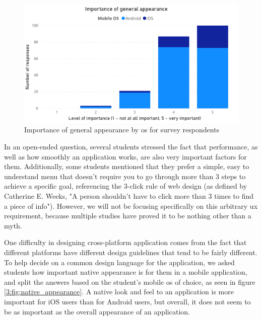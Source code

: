 \begin{figure}[ht]
    \centering
         \includegraphics[width=\textwidth]{figures/charts/survey/appearance.pdf}
    \caption{Importance of general appearance by \acrshort{os} for survey respondents}
    \label{3:fig:appearance}
\end{figure}

In an open-ended question, several students stressed the fact that performance, as well as how smoothly an application works, are also very important factors for them. Additionally, some students mentioned that they prefer a simple, easy to understand menu that doesn't require you to go through more than 3 steps to achieve a specific goal, referencing the 3-click rule of web design (as defined by Catherine E. Weeks\cite{weeks1997design}, "A person shouldn’t have to click more than 3 times to find a piece of info"). However, we will not be focusing specifically on this arbitrary \acrshort{ux} requirement, because multiple studies\cite{porter2003testing}\cite{nielsen2006prioritizing} have proved it to be nothing other than a myth.

One difficulty in designing cross-platform application comes from the fact that different platforms have different design guidelines that tend to be fairly different\cite{thirumala2017interaction}. To help decide on a common design language for the application, we asked students how important native appearance is for them in a mobile application, and split the answers based on the student's mobile \acrshort{os} of choice, as seen in figure \ref{3:fig:native_appearance}. A native look and feel to an application is more important for iOS users than for Android users, but overall, it does not seem to be as important as the overall appearance of an application.

